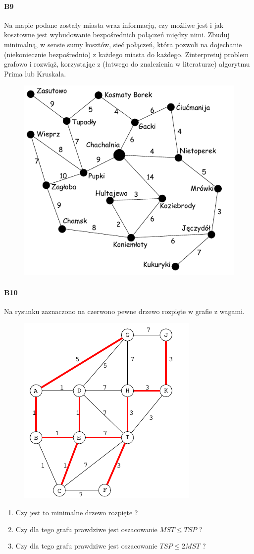 \paragraph{B9} Na mapie podane zostały miasta wraz informacją, czy możliwe jest i jak kosztowne jest wybudowanie bezpośrednich połączeń między nimi. Zbuduj minimalną, w sensie sumy kosztów, sieć połączeń, która pozwoli na dojechanie (niekoniecznie bezpośrednio) z każdego miasta do każdego. Zinterpretuj problem grafowo i rozwiąż, korzystając z (łatwego do znalezienia w literaturze) algorytmu Prima lub Kruskala.
\begin{figure}[H]
\centering
\includegraphics[width=.6\textwidth]{img/2_B9}
\end{figure}

\paragraph{B10} Na rysunku zaznaczono na czerwono pewne drzewo rozpięte w grafie z wagami.
\begin{figure}[H]
\centering
\includegraphics[width=.6\textwidth]{img/2_B10}
\end{figure}
\begin{enumerate}[label=\alph*)]
\item Czy jest to minimalne drzewo rozpięte ?
\item Czy dla tego grafu prawdziwe jest oszacowanie $MST\leq TSP$ ?
\item Czy dla tego grafu prawdziwe jest oszacowanie $TSP\leq 2MST$ ?
\end{enumerate}

